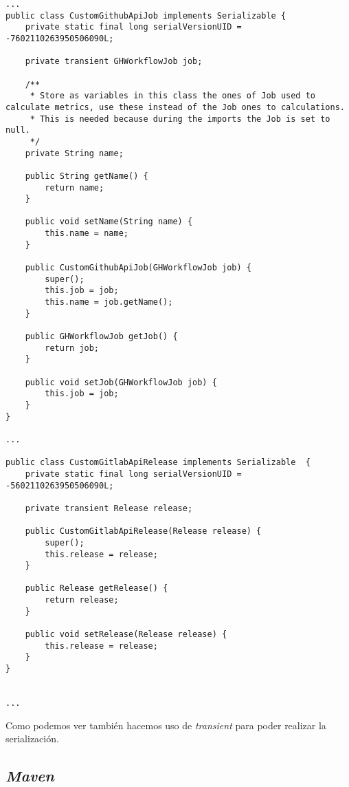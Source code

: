 \begin{minipage}{\linewidth}
{\tiny
\begin{verbatim}
...
public class CustomGithubApiJob implements Serializable {
	private static final long serialVersionUID = -7602110263950506090L;
	
	private transient GHWorkflowJob job;
	
	/**
	 * Store as variables in this class the ones of Job used to calculate metrics, use these instead of the Job ones to calculations.
	 * This is needed because during the imports the Job is set to null.
	 */
	private String name;
	
	public String getName() {
		return name;
	}

	public void setName(String name) {
		this.name = name;
	}

	public CustomGithubApiJob(GHWorkflowJob job) {
		super();
		this.job = job;
		this.name = job.getName();
	}

	public GHWorkflowJob getJob() {
		return job;
	}

	public void setJob(GHWorkflowJob job) {
		this.job = job;
	}
}

...

public class CustomGitlabApiRelease implements Serializable  {
	private static final long serialVersionUID = -5602110263950506090L;

	private transient Release release;

	public CustomGitlabApiRelease(Release release) {
		super();
		this.release = release;
	}

	public Release getRelease() {
		return release;
	}

	public void setRelease(Release release) {
		this.release = release;
	}
}


...
\end{verbatim}
}
\end{minipage}

Como podemos ver también hacemos uso de \textit{transient} para poder realizar la serialización.

\subsection{\textit{Maven}}

